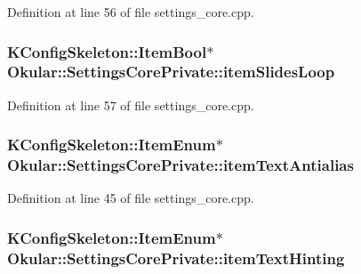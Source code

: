Definition at line 56 of file settings\+\_\+core.\+cpp.

\hypertarget{classOkular_1_1SettingsCorePrivate_a571e262885930ba6549d3af5f9328f67}{
\subsubsection[{item\+Slides\+Loop}]{\setlength{\rightskip}{0pt plus 5cm}K\+Config\+Skeleton\+::\+Item\+Bool$\ast$ Okular\+::\+Settings\+Core\+Private\+::item\+Slides\+Loop}}\label{classOkular_1_1SettingsCorePrivate_a571e262885930ba6549d3af5f9328f67}


Definition at line 57 of file settings\+\_\+core.\+cpp.

\hypertarget{classOkular_1_1SettingsCorePrivate_aa4e6e995b9745ec8aebb6a33674cca51}{
\subsubsection[{item\+Text\+Antialias}]{\setlength{\rightskip}{0pt plus 5cm}K\+Config\+Skeleton\+::\+Item\+Enum$\ast$ Okular\+::\+Settings\+Core\+Private\+::item\+Text\+Antialias}}\label{classOkular_1_1SettingsCorePrivate_aa4e6e995b9745ec8aebb6a33674cca51}


Definition at line 45 of file settings\+\_\+core.\+cpp.

\hypertarget{classOkular_1_1SettingsCorePrivate_ac0923ea9d0acc5f0abe431ed0f4fca98}{
\subsubsection[{item\+Text\+Hinting}]{\setlength{\rightskip}{0pt plus 5cm}K\+Config\+Skeleton\+::\+Item\+Enum$\ast$ Okular\+::\+Settings\+Core\+Private\+::item\+Text\+Hinting}}\label{classOkular_1_1SettingsCorePrivate_ac0923ea9d0acc5f0abe431ed0f4fca98}


